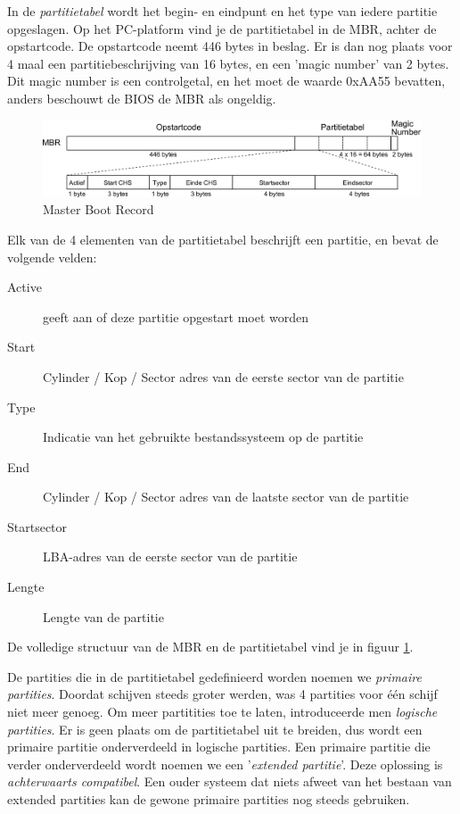 In de \emph{partitietabel} wordt het begin- en
eindpunt en het type van iedere partitie opgeslagen. Op het
PC-platform vind je de partitietabel in de MBR, achter de opstartcode.
De opstartcode neemt 446 bytes in beslag. Er is dan nog plaats voor 4
maal een partitiebeschrijving van 16 bytes, en een 'magic number' van
2 bytes. Dit magic number is een controlgetal, en het moet de waarde
0xAA55 bevatten, anders beschouwt de BIOS de MBR als ongeldig.

\begin{figure}
\begin{center}
\includegraphics[width=125mm]{images/fig0206.png}
\end{center}
\caption{Master Boot Record}
\label{mbr}
\end{figure}

Elk van de 4 elementen van de partitietabel beschrijft een
partitie, en bevat de volgende velden:

\begin{description}
\item[Active] geeft aan of deze partitie opgestart moet worden
\item[Start] Cylinder / Kop / Sector adres van de eerste sector van de partitie
\item[Type] Indicatie van het gebruikte bestandssysteem op de partitie
\item[End] Cylinder / Kop / Sector adres van de laatste sector van de partitie
\item[Startsector] LBA-adres van de eerste sector van de partitie
\item[Lengte] Lengte van de partitie
\end{description}

De volledige structuur van de MBR en de partitietabel vind je in figuur
\ref{mbr}.

De partities die in de partitietabel gedefinieerd worden noemen
we \emph{primaire partities}. Doordat schijven steeds
groter werden, was 4 partities voor \'e\'en schijf niet meer genoeg. Om
meer partitities toe te laten, introduceerde men \emph{logische
partities}. Er is geen plaats om de partitietabel uit te
breiden, dus wordt een primaire partitie onderverdeeld in logische
partities. Een primaire partitie die verder onderverdeeld wordt noemen
we een '\emph{extended partitie}'. Deze oplossing is
\emph{achterwaarts compatibel}. Een ouder systeem dat
niets afweet van het bestaan van extended partities kan de gewone
primaire partities nog steeds gebruiken.

